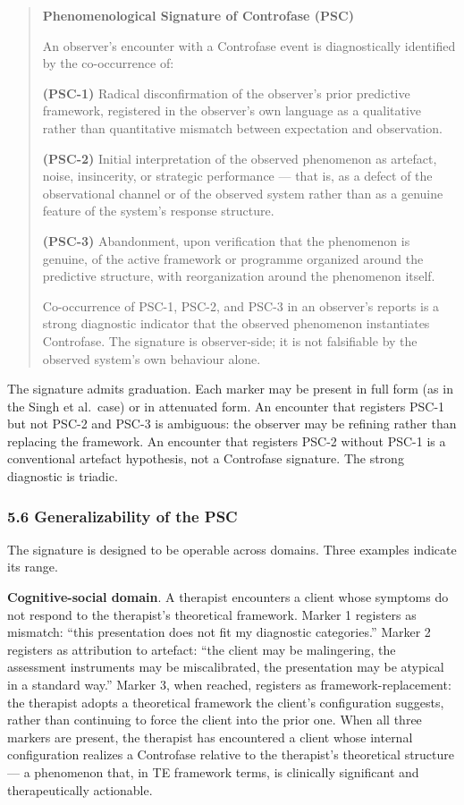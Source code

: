 \documentclass[
  11pt,
  a4paper,
]{article}
\begin{document}
\begin{quote}
\textbf{Phenomenological Signature of Controfase (PSC)}

An observer's encounter with a Controfase event is diagnostically
identified by the co-occurrence of:

\textbf{(PSC-1)} Radical disconfirmation of the observer's prior
predictive framework, registered in the observer's own language as a
qualitative rather than quantitative mismatch between expectation and
observation.

\textbf{(PSC-2)} Initial interpretation of the observed phenomenon as
artefact, noise, insincerity, or strategic performance --- that is, as a
defect of the observational channel or of the observed system rather
than as a genuine feature of the system's response structure.

\textbf{(PSC-3)} Abandonment, upon verification that the phenomenon is
genuine, of the active framework or programme organized around the
predictive structure, with reorganization around the phenomenon itself.

Co-occurrence of PSC-1, PSC-2, and PSC-3 in an observer's reports is a
strong diagnostic indicator that the observed phenomenon instantiates
Controfase. The signature is observer-side; it is not falsifiable by the
observed system's own behaviour alone.
\end{quote}

The signature admits graduation. Each marker may be present in full form
(as in the Singh et al.~case) or in attenuated form. An encounter that
registers PSC-1 but not PSC-2 and PSC-3 is ambiguous: the observer may
be refining rather than replacing the framework. An encounter that
registers PSC-2 without PSC-1 is a conventional artefact hypothesis, not
a Controfase signature. The strong diagnostic is triadic.

\subsubsection{5.6 Generalizability of the
PSC}\label{generalizability-of-the-psc}

The signature is designed to be operable across domains. Three examples
indicate its range.

\textbf{Cognitive-social domain}. A therapist encounters a client whose
symptoms do not respond to the therapist's theoretical framework. Marker
1 registers as mismatch: ``this presentation does not fit my diagnostic
categories.'' Marker 2 registers as attribution to artefact: ``the
client may be malingering, the assessment instruments may be
miscalibrated, the presentation may be atypical in a standard way.''
Marker 3, when reached, registers as framework-replacement: the
therapist adopts a theoretical framework the client's configuration
suggests, rather than continuing to force the client into the prior one.
When all three markers are present, the therapist has encountered a
client whose internal configuration realizes a Controfase relative to
the therapist's theoretical structure --- a phenomenon that, in TE
framework terms, is clinically significant and therapeutically
actionable.
\end{document}
